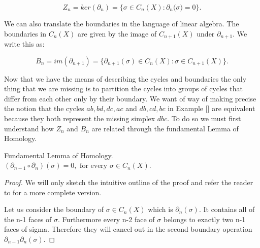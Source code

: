 $$ Z_n = ker(\partial_n) = \Big\{\sigma \in C_{n}(X): \partial_n\big(\sigma\big) = 0 \Big\}. $$

We can also translate the boundaries in the language of linear algebra. The boundaries in $C_n(X)$ are given by the image of $C_{n+1}(X)$ under $\partial_{n+1}$. We write this as:


$$ B_n = im(\partial_{n+1}) = \Big\{\partial_{n+1}(\sigma) \in C_{n}(X): \sigma \in C_{n+1}(X) \Big\}. $$




Now that we have the means of describing the cycles and boundaries the only thing that we are missing is to partition the cycles into groups of cycles that differ from each other only by their boundary. We want of way of making precise the notion that the cycles $ab, bd, dc, ac$ and $db, cd, bc$ in Example [] are equivalent because they both represent the missing simplex $dbc$. To do so we must first understand how $Z_n$ and $B_n$ are related through the fundamental Lemma of Homology.

\begin{lem} Fundamental Lemma of Homology. $(\partial_{n-1} \circ \partial_n) (\sigma) = 0, \text{ for every } \sigma \in C_{n}(X)$. \end{lem}

\begin{proof}
    We will only sketch the intuitive outline of the proof and refer the reader to \cite{algebraic-topology} for a more complete version.

    Let us consider the boundary of $\sigma \in C_n(X)$ which is $\partial_n(\sigma)$. It contains all of the n-1 faces of $\sigma$. Furthermore every n-2 face of $\sigma$ belongs to exactly two n-1 faces of sigma. Therefore they will cancel out in the second boundary operation $\partial_{n-1}\partial_n(\sigma)$.
\end{proof}



